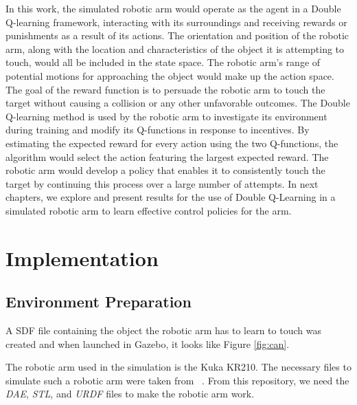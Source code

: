 \documentclass[12pt,oneside]{article}
\begin{document}
In this work, the simulated robotic arm would operate as the agent in a Double Q-learning framework, interacting with its surroundings and receiving rewards or punishments as a result of its actions. The orientation and position of the robotic arm, along with the location and characteristics of the object it is attempting to touch, would all be included in the state space. The robotic arm's range of potential motions for approaching the object would make up the action space. The goal of the reward function is to persuade the robotic arm to touch the target without causing a collision or any other unfavorable outcomes.
The Double Q-learning method is used by the robotic arm to investigate its environment during training and modify its Q-functions in response to incentives. By estimating the expected reward for every action using the two Q-functions, the algorithm would select the action featuring the largest expected reward. The robotic arm would develop a policy that enables it to consistently touch the target by continuing this process over a large number of attempts. In next chapters, we explore and present results for the use of Double Q-Learning in a simulated robotic arm to learn effective control policies for the arm.

%
\section{Implementation}\label{sec:umsetzung}
\subsection{Environment Preparation}\label{sec:env-preparation}
A SDF file containing the object the robotic arm has to learn to touch was created and when launched in Gazebo, it looks like Figure \ref{fig:can}.

The robotic arm used in the simulation is the Kuka KR210. The necessary files to simulate such a robotic arm were taken from ~\cite{RoboND-Kinematics-Project}. From this repository, we need the \textit{DAE}, \textit{STL}, and \textit{URDF} files to make the robotic arm work.
\end{document}
